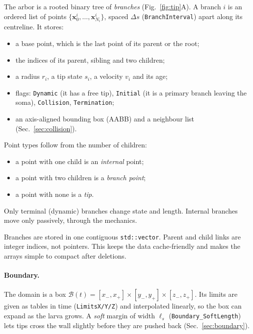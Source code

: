 \documentclass[11pt,a4paper]{article}
\newcommand{\code}[1]{\texttt{#1}}
\newcommand{\vect}[1]{\bm{#1}}
\begin{document}
The arbor is a rooted binary tree of \emph{branches} (Fig.~\ref{fig:tip}A). A branch $i$ is an ordered list of points $\{\vect x^i_0,\dots,\vect x^i_{N_i}\}$, spaced $\Delta s$ (\code{BranchInterval}) apart along its centreline. It stores:
\begin{itemize}
  \item a base point, which is the last point of its parent or the root;
  \item the indices of its parent, sibling and two children;
  \item a radius $r_i$, a tip state $s_i$, a velocity $v_i$ and its age;
  \item flags: \code{Dynamic} (it has a free tip), \code{Initial} (it is a primary branch leaving the soma), \code{Collision}, \code{Termination};
  \item an axis-aligned bounding box (AABB) and a neighbour list (Sec.~\ref{sec:collision}).
\end{itemize}

Point types follow from the number of children:
\begin{itemize}
  \item a point with one child is an \emph{internal} point;
  \item a point with two children is a \emph{branch point};
  \item a point with none is a \emph{tip}.
\end{itemize}
Only terminal (dynamic) branches change state and length. Internal branches move only passively, through the mechanics.

Branches are stored in one contiguous \code{std::vector}. Parent and child links are integer indices, not pointers. This keeps the data cache-friendly and makes the arrays simple to compact after deletions.

\paragraph{Boundary.}
The domain is a box $\mathcal B(t)=[x_-,x_+]\times[y_-,y_+]\times[z_-,z_+]$. Its limits are given as tables in time (\code{LimitsX/Y/Z}) and interpolated linearly, so the box can expand as the larva grows. A \emph{soft} margin of width $\ell_s$ (\code{Boundary\_SoftLength}) lets tips cross the wall slightly before they are pushed back (Sec.~\ref{sec:boundary}).
\end{document}
